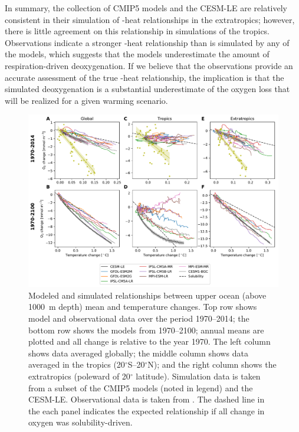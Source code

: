 \documentclass[draft,linenumbers]{report_chapter}
\begin{document}
In summary, the collection of CMIP5 models and the CESM-LE are relatively consistent in their simulation of -heat relationships in the extratropics; however, there is little agreement on this relationship in simulations of the tropics.
Observations indicate a stronger -heat relationship than is simulated by any of the models, which suggests that the models underestimate the amount of respiration-driven deoxygenation.
If we believe that the observations provide an accurate assessment of the true -heat relationship, the implication is that the simulated deoxygenation is a substantial underestimate of the oxygen loss that will be realized for a given warming scenario.

\begin{figure}[tbp]
\centering
\includegraphics[width=1.1\textwidth]{o2change-temp-phase-diag.pdf}
\caption{Modeled and simulated relationships between upper ocean (above 1000~m depth) mean  and temperature changes.
Top row shows model and observational data over the period 1970--2014; the bottom row shows the models from 1970--2100; annual means are plotted and all change is relative to the year 1970.
The left column shows data averaged globally; the middle column shows data averaged in the tropics (20$^\circ$S--20$^\circ$N); and the right column shows  the extratropics (poleward of 20$^\circ$ latitude).
Simulation data is taken from a subset of the CMIP5 models (noted in legend) and the CESM-LE.
Observational data is taken from \citet{Ito-Minobe-etal-2017}.
The dashed line in the each panel indicates the expected relationship if all change in oxygen was solubility-driven.
}
\label{fig:o2-heat}
\end{figure}
\end{document}

